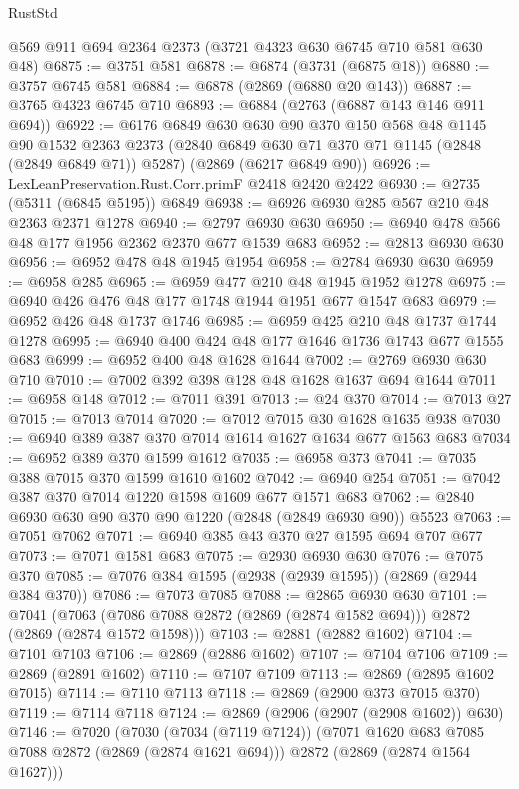\begin{lexlean}{RustStd}
\begin{coremodule}
    @569
    @911
    @694
    @2364
    @2373
    (@3721 @4323 @630 @6745 @710 @581 @630 @48)
@6875 := @3751 @581
@6878 := @6874 (@3731 (@6875 @18))
@6880 := @3757 @6745 @581
@6884 := @6878 (@2869 (@6880 @20 @143))
@6887 := @3765 @4323 @6745 @710
@6893 := @6884 (@2763 (@6887 @143 @146 @911 @694))
@6922 := @6176
    @6849
    @630
    @630
    @90
    @370
    @150
    @568
    @48
    @1145
    @90
    @1532
    @2363
    @2373
    (@2840 @6849 @630 @71 @370 @71 @1145 (@2848 (@2849 @6849 @71)) @5287)
    (@2869 (@6217 @6849 @90))
@6926 := LexLeanPreservation.Rust.Corr.primF @2418 @2420 @2422
@6930 := @2735 (@5311 (@6845 @5195)) @6849
@6938 := @6926 @6930 @285 @567 @210 @48 @2363 @2371 @1278
@6940 := @2797 @6930 @630
@6950 := @6940 @478 @566 @48 @177 @1956 @2362 @2370 @677 @1539 @683
@6952 := @2813 @6930 @630
@6956 := @6952 @478 @48 @1945 @1954
@6958 := @2784 @6930 @630
@6959 := @6958 @285
@6965 := @6959 @477 @210 @48 @1945 @1952 @1278
@6975 := @6940 @426 @476 @48 @177 @1748 @1944 @1951 @677 @1547 @683
@6979 := @6952 @426 @48 @1737 @1746
@6985 := @6959 @425 @210 @48 @1737 @1744 @1278
@6995 := @6940 @400 @424 @48 @177 @1646 @1736 @1743 @677 @1555 @683
@6999 := @6952 @400 @48 @1628 @1644
@7002 := @2769 @6930 @630 @710
@7010 := @7002 @392 @398 @128 @48 @1628 @1637 @694 @1644
@7011 := @6958 @148
@7012 := @7011 @391
@7013 := @24 @370
@7014 := @7013 @27
@7015 := @7013 @7014
@7020 := @7012 @7015 @30 @1628 @1635 @938
@7030 := @6940 @389 @387 @370 @7014 @1614 @1627 @1634 @677 @1563 @683
@7034 := @6952 @389 @370 @1599 @1612
@7035 := @6958 @373
@7041 := @7035 @388 @7015 @370 @1599 @1610 @1602
@7042 := @6940 @254
@7051 := @7042 @387 @370 @7014 @1220 @1598 @1609 @677 @1571 @683
@7062 := @2840 @6930 @630 @90 @370 @90 @1220 (@2848 (@2849 @6930 @90)) @5523
@7063 := @7051 @7062
@7071 := @6940 @385 @43 @370 @27 @1595 @694 @707 @677
@7073 := @7071 @1581 @683
@7075 := @2930 @6930 @630
@7076 := @7075 @370
@7085 := @7076 @384 @1595 (@2938 (@2939 @1595)) (@2869 (@2944 @384 @370))
@7086 := @7073 @7085
@7088 := @2865 @6930 @630
@7101 := @7041
    (@7063 (@7086 @7088 @2872 (@2869 (@2874 @1582 @694))) @2872 (@2869 (@2874 @1572 @1598)))
@7103 := @2881 (@2882 @1602)
@7104 := @7101 @7103
@7106 := @2869 (@2886 @1602)
@7107 := @7104 @7106
@7109 := @2869 (@2891 @1602)
@7110 := @7107 @7109
@7113 := @2869 (@2895 @1602 @7015)
@7114 := @7110 @7113
@7118 := @2869 (@2900 @373 @7015 @370)
@7119 := @7114 @7118
@7124 := @2869 (@2906 (@2907 (@2908 @1602)) @630)
@7146 := @7020
    (@7030
      (@7034 (@7119 @7124))
      (@7071 @1620 @683 @7085 @7088 @2872 (@2869 (@2874 @1621 @694)))
      @2872
      (@2869 (@2874 @1564 @1627)))

\end{coremodule}
\end{lexlean}

